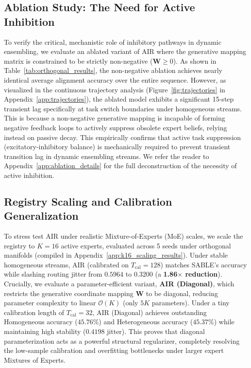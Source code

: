 \subsection{Ablation Study: The Need for Active Inhibition}
\label{subsec:ablation_inhibition}
To verify the critical, mechanistic role of inhibitory pathways in dynamic ensembling, we evaluate an ablated variant of AIR where the generative mapping matrix is constrained to be strictly non-negative ($\mathbf{W} \ge 0$). As shown in Table~\ref{tab:orthogonal_results}, the non-negative ablation achieves nearly identical average alignment accuracy over the entire sequence. However, as visualized in the continuous trajectory analysis (Figure~\ref{fig:trajectories} in Appendix~\ref{app:trajectories}), the ablated model exhibits a significant 15-step transient lag specifically at task switch boundaries under homogeneous streams. This is because a non-negative generative mapping is incapable of forming negative feedback loops to actively suppress obsolete expert beliefs, relying instead on passive decay. This empirically confirms that active task suppression (excitatory-inhibitory balance) is mechanically required to prevent transient transition lag in dynamic ensembling streams. We refer the reader to Appendix~\ref{app:ablation_details} for the full deconstruction of the necessity of active inhibition.

\subsection{Registry Scaling and Calibration Generalization}
\label{subsec:scaling_generalization}
To stress test AIR under realistic Mixture-of-Experts (MoE) scales, we scale the registry to $K=16$ active experts, evaluated across 5 seeds under orthogonal manifolds (compiled in Appendix~\ref{app:k16_scaling_results}). Under stable homogeneous streams, AIR (calibrated on $T_{\text{cal}} = 128$) matches SABLE's accuracy while slashing routing jitter from $0.5964$ to $0.3200$ (a \textbf{1.86$\times$ reduction}). Crucially, we evaluate a parameter-efficient variant, \textbf{AIR (Diagonal)}, which restricts the generative coordinate mapping $\mathbf{W}$ to be diagonal, reducing parameter complexity to linear $\mathcal{O}(K)$ (only $5K$ parameters). Under a tiny calibration length of $T_{\text{cal}} = 32$, AIR (Diagonal) achieves outstanding Homogeneous accuracy ($45.76\%$) and Heterogeneous accuracy ($45.37\%$) while maintaining high stability ($0.4198$ jitter). This proves that diagonal parameterization acts as a powerful structural regularizer, completely resolving the low-sample calibration and overfitting bottlenecks under larger expert Mixtures of Experts.

